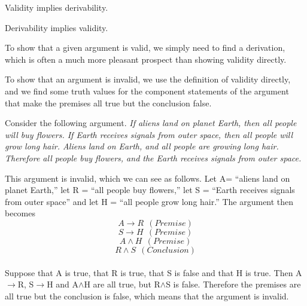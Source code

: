 \documentclass[]{article}
\begin{document}
\begin{thm} Validity implies derivability.
\end{thm}
\begin{thm} Derivability implies validity.
\end{thm}
\begin{rem} To show that a given argument is valid, we simply need to find a derivation, which is often a much more pleasant prospect than showing validity directly.
\end{rem}
\begin{rem} To show that an argument is invalid, we use the definition of validity directly, and we find some truth values for the component statements of the argument that make the premises all true but the conclusion false.
\end{rem}
    
\begin{exmp}
Consider the following argument.
\emph{
If aliens land on planet Earth, then all people will buy flowers. If Earth receives signals from outer space, then all people will grow long hair. Aliens land on Earth, and all people are growing long hair. Therefore all people buy flowers, and the Earth receives signals from outer space.}
    	
			This argument is invalid, which we can see as follows. Let A= ``aliens land on planet Earth,'' let R = ``all people buy flowers,'' let S = ``Earth receives signals from outer space'' and let H = ``all people grow long hair.'' The argument then becomes
    	\\
    	\begin{equation*}
    	A \rightarrow R ~~ (Premise)
    	\end{equation*}
    	\begin{equation*}
    	S \rightarrow H ~~ (Premise)
    	\end{equation*}
    	\begin{equation*}
    	A \wedge H ~~ (Premise)
    	\end{equation*}
    	\begin{equation*}
    	R \wedge S ~~ (Conclusion)
    	\end{equation*}
    	\\ Suppose that A is true, that R is true, that S is false and that H is true. Then A$\rightarrow$R, S$\rightarrow$H and A$\wedge$H are all true, but R$\wedge$S is false. Therefore the premises are all true but the conclusion is false, which means that the argument is invalid.	 
\end{exmp}
\end{document}
